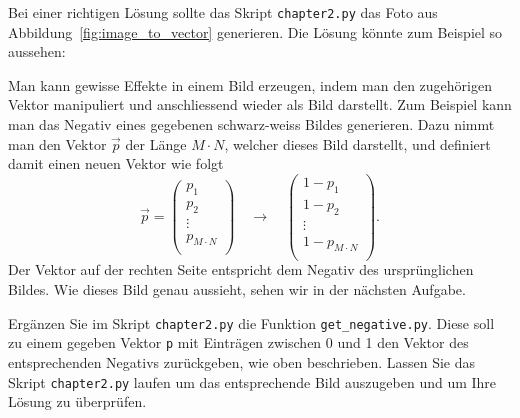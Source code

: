 \begin{losung}
	Bei einer richtigen Lösung sollte das Skript \texttt{chapter2.py} das Foto aus Abbildung~\ref{fig:image_to_vector} generieren.
	Die Lösung könnte zum Beispiel so aussehen:

\end{losung}
Man kann gewisse Effekte in einem Bild erzeugen, indem man den zugehörigen Vektor manipuliert und anschliessend wieder als Bild darstellt.
Zum Beispiel kann man das Negativ eines gegebenen schwarz-weiss Bildes generieren.
Dazu nimmt man den Vektor $\vec p$ der Länge $M\cdot N$, welcher dieses Bild darstellt, und definiert damit einen neuen Vektor wie folgt
\begin{equation*}
	\vec p=
	\begin{pmatrix}
		p_1 \\ p_2 \\ \vdots \\ p_{M\cdot N} \\
	\end{pmatrix}
	\quad\longrightarrow\quad
	\begin{pmatrix}
		1-p_1 \\ 1-p_2 \\ \vdots \\ 1-p_{M\cdot N} \\
	\end{pmatrix}.
\end{equation*}
Der Vektor auf der rechten Seite entspricht dem Negativ des ursprünglichen Bildes.
Wie dieses Bild genau aussieht, sehen wir in der nächsten Aufgabe.
\begin{aufgabe} \label{aufg:negative}
	Ergänzen Sie im Skript \texttt{chapter2.py} die Funktion \texttt{get\_negative.py}.
	Diese soll zu einem gegeben Vektor \texttt{p} mit Einträgen zwischen 0 und 1 den Vektor des entsprechenden Negativs zurückgeben, wie oben beschrieben.
	Lassen Sie das Skript \texttt{chapter2.py} laufen um das entsprechende Bild auszugeben und um Ihre Lösung zu überprüfen.
\end{aufgabe}
